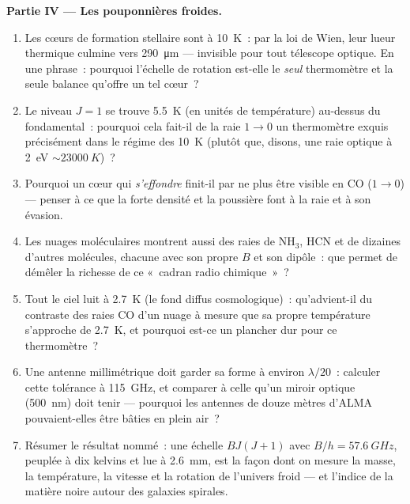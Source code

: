 \begin{problem}
\medskip\noindent\textbf{Partie IV --- Les pouponnières froides.}
\begin{enumerate}[resume]
  \item Les cœurs de formation stellaire sont à \qty{10}{K}~: par la
        loi de Wien, leur lueur thermique culmine vers
        \qty{290}{\micro m} --- invisible pour tout télescope
        optique. En une phrase~: pourquoi l'échelle de rotation
        est-elle le \emph{seul} thermomètre et la seule balance
        qu'offre un tel cœur~?
  \item Le niveau $J = 1$ se trouve \qty{5.5}{K} (en unités de
        température) au-dessus du fondamental~: pourquoi cela fait-il
        de la raie $1\to0$ un thermomètre exquis précisément dans le
        régime des \qty{10}{K} (plutôt que, disons, une raie optique
        à \qty{2}{eV} $\sim \qty{23000}{K}$)~?
  \item Pourquoi un cœur qui \emph{s'effondre} finit-il par ne plus
        être visible en CO ($1\to0$) --- penser à ce que la forte
        densité et la poussière font à la raie et à son évasion.
  \item Les nuages moléculaires montrent aussi des raies de NH$_3$,
        HCN et de dizaines d'autres molécules, chacune avec son
        propre $B$ et son dipôle~: que permet de démêler la richesse
        de ce «~cadran radio chimique~»~?
  \item Tout le ciel luit à \qty{2.7}{K} (le fond diffus
        cosmologique)~: qu'advient-il du contraste des raies CO d'un
        nuage à mesure que sa propre température s'approche de
        \qty{2.7}{K}, et pourquoi est-ce un plancher dur pour ce
        thermomètre~?
  \item Une antenne millimétrique doit garder sa forme à environ
        $\lambda/20$~: calculer cette tolérance à \qty{115}{GHz}, et
        comparer à celle qu'un miroir optique (\qty{500}{nm}) doit
        tenir --- pourquoi les antennes de douze mètres d'ALMA
        pouvaient-elles être bâties en plein air~?
  \item Résumer le résultat nommé~: une échelle $BJ(J+1)$ avec $B/h =
        \qty{57.6}{GHz}$, peuplée à dix kelvins et lue à
        \qty{2.6}{mm}, est la façon dont on mesure la masse, la
        température, la vitesse et la rotation de l'univers froid ---
        et l'indice de la matière noire autour des galaxies spirales.
\end{enumerate}
\end{problem}

